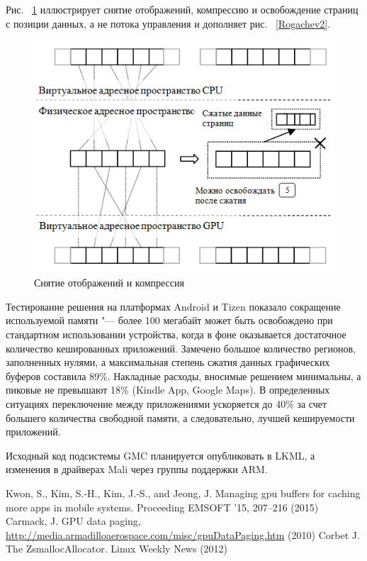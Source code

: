 \documentclass[10pt, a5paper]{article}
\begin{document}
Рис. ~\ref{Rogachev3} иллюстрирует снятие отображений, компрессию и освобождение страниц с позиции данных, а не потока управления и дополняет рис. ~\ref{Rogachev2}.

\begin{figure}
  \centering
  \includegraphics[]{18_2016_Rogachev3.png}
  \caption{Снятие отображений и компрессия}
  \label{Rogachev3}
\end{figure}

Тестирование решения на платформах Android и Tizen показало сокращение используемой памяти "--- более 100 мегабайт может быть освобождено при стандартном использовании устройства, когда в фоне оказывается достаточное количество кешированных приложений. Замечено большое количество регионов, заполненных нулями, а максимальная степень сжатия данных графических буферов составила 89\%. Накладные расходы, вносимые решением минимальны, а пиковые не превышают 18\% (Kindle App, Google Maps). В определенных ситуациях переключение между приложениями ускоряется до 40\% за счет большего количества свободной памяти, а следовательно, лучшей кешируемости приложений.

Исходный код подсистемы GMC планируется опубликовать в LKML, а изменения в драйверах Mali через группы поддержки ARM.

\begin{thebibliography}{99}
 Kwon, S., Kim, S.-H., Kim, J.-S., and Jeong, J. Managing gpu buffers for caching more apps in mobile systems. Proceeding EMSOFT '15, 207–216 (2015)
 Carmack, J. GPU data paging, \url{http://media.armadilloaerospace.com/misc/gpuDataPaging.htm} (2010)
 Corbet J. The ZsmallocAllocator. Linux Weekly News (2012)
\end{thebibliography}
\end{document}
